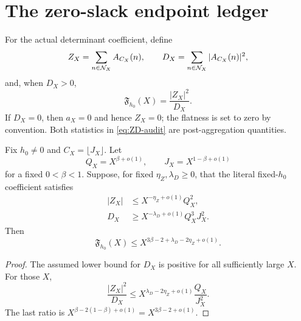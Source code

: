 \section{The zero-slack endpoint ledger}
\label{sec:endpoint-ledger}

For the actual determinant coefficient, define
\begin{equation}
 Z_X=\sum_{n\in\mathcal N_X}A_{C_X}(n),\qquad
 D_X=\sum_{n\in\mathcal N_X}|A_{C_X}(n)|^2,
\label{eq:ZD-audit}
\end{equation}
and, when \(D_X>0\),
\begin{equation}
 \mathfrak F_{h_0}(X)=\frac{|Z_X|^2}{D_X}.
\label{eq:flatness-audit}
\end{equation}
If \(D_X=0\), then \(a_X=0\) and hence \(Z_X=0\); the flatness is set
to zero by convention.  Both statistics in \eqref{eq:ZD-audit} are
post-aggregation quantities.

\begin{theorem}
\label{thm:general-two-exponent}
Fix \(h_0\ne0\) and \(C_X=\lfloor J_X\rfloor\).  Let
\[
 Q_X=X^{\beta+o(1)},\qquad
 J_X=X^{1-\beta+o(1)}
\]
for a fixed \(0<\beta<1\).  Suppose, for fixed
\(\eta_Z,\lambda_D\ge0\), that the literal fixed-\(h_0\) coefficient
satisfies
\begin{align}
 |Z_X|&\le X^{-\eta_Z+o(1)}Q_X^2,
 \label{eq:zero-exponent-audit}\\
 D_X&\ge X^{-\lambda_D+o(1)}Q_X^3J_X^2.
 \label{eq:energy-exponent-audit}
\end{align}
Then
\begin{equation}
 \mathfrak F_{h_0}(X)
 \le
 X^{3\beta-2+\lambda_D-2\eta_Z+o(1)}.
\label{eq:general-flatness-audit}
\end{equation}
\end{theorem}

\begin{proof}
The assumed lower bound for \(D_X\) is positive for all sufficiently
large \(X\).  For those \(X\),
\[
 \frac{|Z_X|^2}{D_X}
 \le
 X^{\lambda_D-2\eta_Z+o(1)}
 \frac{Q_X}{J_X^2}.
\]
The last ratio is
 \(X^{\beta-2(1-\beta)+o(1)}
 =X^{3\beta-2+o(1)}\).
\end{proof}

